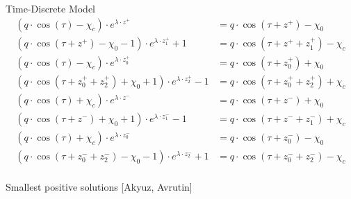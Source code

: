 \begin{frame}{Time-Discrete Model}
	\vspace{-3em}
	\begin{align*}
		(q \cdot \cos(\tau) - \chi_{c}) \cdot e^{\lambda \cdot z^{+}}
		 & = q \cdot \cos(\tau + z^{+}) - \chi_{0}                  \\
		(q \cdot \cos(\tau + z^{+}) - \chi_{0} - 1) \cdot e^{\lambda \cdot z_{1}^{+}} + 1
		 & = q \cdot  \cos(\tau + z^{+} + z_{1}^{+}) - \chi_{c}     \\
		(q \cdot \cos(\tau) - \chi_{c}) \cdot e^{\lambda \cdot z_{0}^{+}}
		 & = q \cdot \cos(\tau + z_{0}^{+}) + \chi_{0}              \\
		(q \cdot \cos(\tau + z_{0}^{+} + z_{2}^{+}) + \chi_{0} + 1) \cdot e^{\lambda \cdot z_{2}^{+}} - 1
		 & = q \cdot  \cos(\tau + z_{0}^{+} + z_{2}^{+}) + \chi_{c} \\[1em]
		(q \cdot \cos(\tau) + \chi_{c}) \cdot e^{\lambda \cdot z^{-}}
		 & = q \cdot \cos(\tau + z^{-}) + \chi_{0}                  \\
		(q \cdot \cos(\tau + z^{-}) + \chi_{0} + 1) \cdot e^{\lambda \cdot z_{1}^{-}} - 1
		 & = q \cdot  \cos(\tau + z^{-} + z_{1}^{-}) + \chi_{c}     \\
		(q \cdot \cos(\tau) + \chi_{c}) \cdot e^{\lambda \cdot z_{0}^{-}}
		 & = q \cdot \cos(\tau + z_{0}^{-}) - \chi_{0}              \\
		(q \cdot \cos(\tau + z_{0}^{-} + z_{2}^{-}) - \chi_{0} - 1) \cdot e^{\lambda \cdot z_{2}^{-}} + 1
		 & = q \cdot  \cos(\tau + z_{0}^{-} + z_{2}^{-}) - \chi_{c} \\
	\end{align*}
	\vspace{-3em}
	\begin{flushright}
		Smallest positive solutions
		\hfill
		[Akyuz, Avrutin]
	\end{flushright}
\end{frame}

